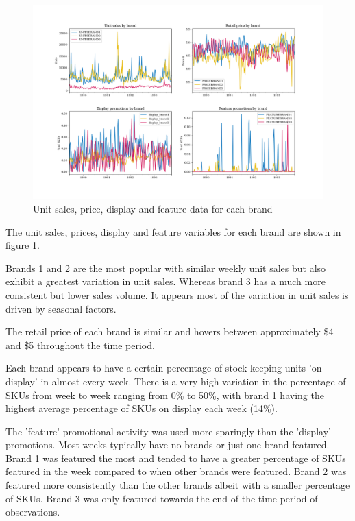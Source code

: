 \documentclass[a4paper,11pt]{article}
\begin{document}
\begin{figure}
  \centering
  \includegraphics[scale=0.38]{eda_plots}
  \caption{Unit sales, price, display and feature data for each brand}\label{fig:eda-plots}
\end{figure}

The unit sales, prices, display and feature variables for each brand are shown in figure \ref{fig:eda-plots}. 

Brands 1 and 2 are the most popular with similar weekly unit sales but also exhibit a greatest variation in unit sales. Whereas brand 3 has a much more consistent but lower sales volume. It appears most of the variation in unit sales is driven by seasonal factors.

The retail price of each brand is similar and hovers between approximately \$4 and \$5 throughout the time period. 

Each brand appears to have a certain percentage of stock keeping units 'on display' in almost every week. There is a very high variation in the percentage of SKUs from week to week ranging from 0\% to 50\%, with brand 1 having the highest average percentage of SKUs on display each week (14\%).

The 'feature' promotional activity was used more sparingly than the 'display' promotions. Most weeks typically have no brands or just one brand featured. Brand 1 was featured the most and tended to have a greater percentage of SKUs featured in the week compared to when other brands were featured. Brand 2 was featured more consistently than the other brands albeit with a smaller percentage of SKUs. Brand 3 was only featured towards the end of the time period of observations. 
\end{document}
